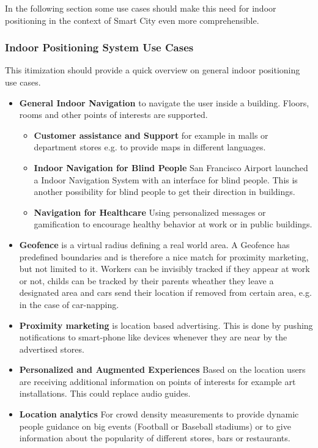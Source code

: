 In the following section some use cases should make this need for indoor positioning in the context of Smart City even more comprehensible.

\subsubsection{Indoor Positioning System Use Cases}

This itimization should provide a quick overview on general indoor positioning use cases.

\begin{itemize}
	\item \textbf{General Indoor Navigation} to navigate the user inside a building. Floors, rooms and other points of interests are supported.
	\begin{itemize}
		\item \textbf{Customer assistance and Support} for example in malls or department stores e.g. to provide maps in different languages. 
		\item \textbf{Indoor Navigation for Blind People} San Francisco Airport launched a Indoor Navigation System with an interface for blind people. This is another possibility for blind people to get their direction in buildings.
		\item \textbf{Navigation for Healthcare} Using personalized messages or gamification to encourage healthy behavior at work or in public buildings. \\
		\parencite{healthPosition}
	\end{itemize}
	\item \textbf{Geofence} is a virtual radius defining a real world area. A Geofence has predefined boundaries and is therefore a nice match for proximity marketing, but not limited to it. Workers can be invisibly tracked if they appear at work or not, childs can be tracked by their parents wheather they leave a designated area and cars send their location if removed from certain area, e.g. in the case of car-napping.
	\item \textbf{Proximity marketing} is location based advertising. This is done by pushing notifications to smart-phone like devices whenever they are near by the advertised stores.  
	\item \textbf{Personalized and Augmented Experiences} Based on the location users are receiving additional information on points of interests for example art installations. This could replace audio guides.
	\item \textbf{Location analytics} For crowd density measurements to provide dynamic people guidance on big events (Football or Baseball stadiums) or to give information about the popularity of different stores, bars or restaurants.

\end{itemize}
